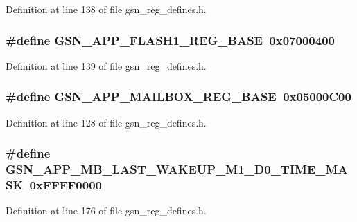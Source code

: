 Definition at line 138 of file gsn\_\-reg\_\-defines.h.

\hypertarget{a00546_aabc1da33628508df4a6e855b76be987a}{
\subsubsection[{GSN\_\-APP\_\-FLASH1\_\-REG\_\-BASE}]{\setlength{\rightskip}{0pt plus 5cm}\#define GSN\_\-APP\_\-FLASH1\_\-REG\_\-BASE~0x07000400}}
\label{a00546_aabc1da33628508df4a6e855b76be987a}


Definition at line 139 of file gsn\_\-reg\_\-defines.h.

\hypertarget{a00546_ab958988d29e783cfca77d69ca8046f3a}{
\subsubsection[{GSN\_\-APP\_\-MAILBOX\_\-REG\_\-BASE}]{\setlength{\rightskip}{0pt plus 5cm}\#define GSN\_\-APP\_\-MAILBOX\_\-REG\_\-BASE~0x05000C00}}
\label{a00546_ab958988d29e783cfca77d69ca8046f3a}


Definition at line 128 of file gsn\_\-reg\_\-defines.h.

\hypertarget{a00546_a77e5d0f56f8ba4f0646b40cd38bb63e0}{
\subsubsection[{GSN\_\-APP\_\-MB\_\-LAST\_\-WAKEUP\_\-M1\_\-D0\_\-TIME\_\-MASK}]{\setlength{\rightskip}{0pt plus 5cm}\#define GSN\_\-APP\_\-MB\_\-LAST\_\-WAKEUP\_\-M1\_\-D0\_\-TIME\_\-MASK~0xFFFF0000}}
\label{a00546_a77e5d0f56f8ba4f0646b40cd38bb63e0}


Definition at line 176 of file gsn\_\-reg\_\-defines.h.

